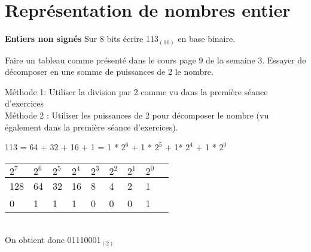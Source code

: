 \section{Représentation de nombres entier}

\begin{Exercice}[15 minutes] \textbf{Entiers non signés}
	Sur 8 bits écrire 113$_{(10)}$ en base binaire.
   
    \begin{conseil}
		Faire un tableau comme présenté dans le cours page 9 de la semaine 3. Essayer de décomposer en une somme de puissances de 2 le nombre.
    \end{conseil}
    
    \begin{solution}
        Méthode 1: Utiliser la division par 2 comme vu dans la première séance d'exercices\\
        
        Méthode 2 : Utiliser les puissances de 2 pour décomposer le nombre (vu également dans la première séance d'exercices).
        
        113 = 64 + 32 + 16 + 1 = 1 * $2^6$ + 1 * $2^5$ + 1* $2^4$ + 1 * $2^0$ \\
        
        \begin{tabular}{| p{1cm} | p{1cm} | p{1cm} | p{1cm} | p{1cm} | p{1cm} | p{1cm} | p{1cm} | p{1cm} |} 
            \hline
	      	$2^7$ & $2^6$ & $2^5$ & $2^4$ & $2^3$ & $2^2$ & $2^1$ & $2^0$ \\ [0.5ex]
	    	\hline
            128 & 64 & 32 & 16 & 8 & 4 & 2 & 1 \\ [0.5ex] 
            \hline
            0 & 1 & 1 & 1 & 0 & 0 & 0 & 1 \\ [0.5ex] 
            \hline
        \end{tabular} \\
        
        On obtient donc 01110001$_{(2)}$ \\
    \end{solution}
\end{Exercice}

